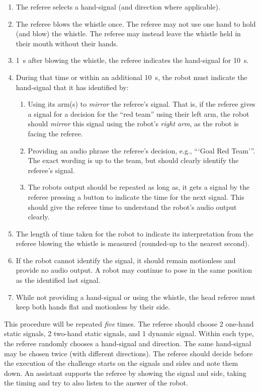         \begin{enumerate}
            
            \item The referee selects a hand-signal (and direction where applicable).
            \item The referee blows the whistle once. The referee may not use one hand to hold (and blow) the whistle. The referee may instead leave the whistle held in their mouth without their hands.
            \item \qty{1}{\second} after blowing the whistle, the referee indicates the hand-signal for \qty{10}{\second}.
            \item During that time or within an additional \qty{10}{\second}, the robot must indicate the hand-signal that it has identified by:
            \begin{enumerate}
                \item Using its arm(s) to \emph{mirror} the referee's signal. That is, if the referee gives a signal for a decision for the ``red team'' using their left arm, the robot should \emph{mirror} this signal using the robot's \emph{right arm}, as the robot is facing the referee.
                \item Providing an audio phrase the referee's decision, e.g., ```Goal Red Team'''.  The exact wording is up to the team, but should clearly identify the referee's signal.
                \item The robots output should be repeated as long as, it gets a signal by the referee pressing a button to indicate the time for the next signal. This should give the referee time to understand the robot's audio output clearly.
            \end{enumerate}
            \item The length of time taken for the robot to indicate its interpretation from the referee blowing the whistle is measured (rounded-up to the nearest second).
            \item If the robot cannot identify the signal, it should remain motionless and provide no audio output. A robot may continue to pose in the same position as the identified last signal.
            \item While not providing a hand-signal or using the whistle, the head referee must keep both hands flat and motionless by their side.
        \end{enumerate}

        This procedure will be repeated \textit{five} times. The referee should choose 2 one-hand static signals, 2 two-hand static signals, and 1 dynamic signal. Within each type, the referee randomly chooses a hand-signal and direction. The same hand-signal may be chosen twice (with different directions). The referee should decide before the execution of the challenge starts on the signals and sides and note them down. An assistant supports the referee by showing the signal and side, taking the timing and try to also listen to the answer of the robot.

